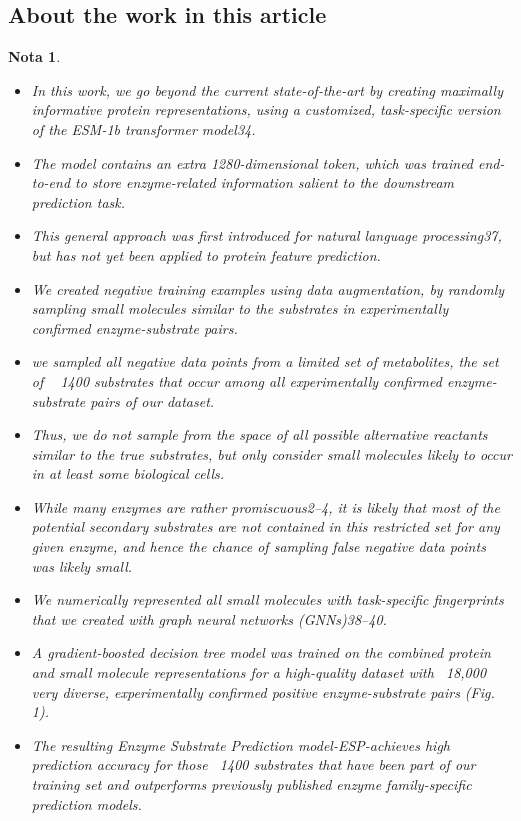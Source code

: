 \documentclass[12pt]{article}
\newtheorem{Note}{Nota}%
\begin{document}
\subsection{About the work in this article}

\begin{Note}
\begin{itemize}

\item In this work, we go beyond the current state-of-the-art by creating maximally informative protein representations, using a customized, task-speciﬁc version of the ESM-1b transformer model34. 

\item The model contains an extra 1280-dimensional token, which was trained end-to-end to store enzyme-related information salient to the downstream prediction task. 

\item This general approach was ﬁrst introduced for natural language processing37, but has not yet been applied to protein feature prediction. 

\item We created negative training examples using data augmentation, by randomly sampling small molecules similar to the substrates in experimentally conﬁrmed enzyme-substrate pairs.

\item we sampled all negative data points from a limited set of metabolites, the set of ~ 1400 substrates that occur among all experimentally conﬁrmed enzyme-substrate pairs of our dataset. 

\item Thus, we do not sample from the space of all possible alternative reactants similar to the true substrates, but only consider small molecules likely to occur in at least some biological cells. 

\item While many enzymes are rather promiscuous2–4, it is likely that most of the potential secondary substrates are not contained in this restricted set for any given enzyme, and hence the chance of sampling false negative data points was likely small. 

\item We numerically represented all small molecules with task-speciﬁc ﬁngerprints that we created with graph neural networks (GNNs)38–40. 

\item A gradient-boosted decision tree model was trained on the combined protein and small molecule representations for a high-quality dataset with ~18,000 very diverse, experimentally conﬁrmed positive enzyme-substrate pairs (Fig. 1). 

\item The resulting Enzyme Substrate Prediction model-ESP-achieves high prediction accuracy for those ~1400 substrates that have been part of our training set and outperforms previously published enzyme family-speciﬁc prediction models.
\end{itemize}

\end{Note}
\end{document}

